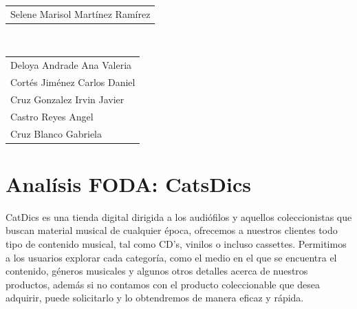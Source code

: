 \documentclass[12pt]{article}
\begin{document}
\begin{titlepage}
\begin{center}
\begin{tabular}{l}
\large Selene Marisol Martínez Ramírez \\[0.5cm]
\end{tabular}

\\[0.6cm]
\color{black}
\centering
\begin{tabular}{l}


\large Deloya Andrade Ana Valeria \\[0.4cm]

\large   Cortés Jiménez Carlos Daniel \\[0.4cm]

\large  Cruz Gonzalez Irvin Javier \\[0.4cm]

\large  Castro Reyes Angel  \\[0.4cm]

\large   Cruz Blanco Gabriela \\[0.4cm]
\end{tabular}

\vfill

\end{center}
\end{titlepage}

\section*{Analísis FODA: CatsDics}

\noindent CatDics es una tienda digital dirigida a los audiófilos y aquellos coleccionistas que buscan material musical de cualquier época, ofrecemos a nuestros clientes todo tipo de contenido musical, tal como CD's, vinilos o incluso cassettes. 
Permitimos a los usuarios explorar cada categoría, como el medio en el que se encuentra el contenido, géneros musicales y algunos otros detalles acerca de nuestros productos, además si no contamos con el producto coleccionable que desea adquirir, puede solicitarlo y lo obtendremos de manera eficaz y rápida.
\\
\end{document}
